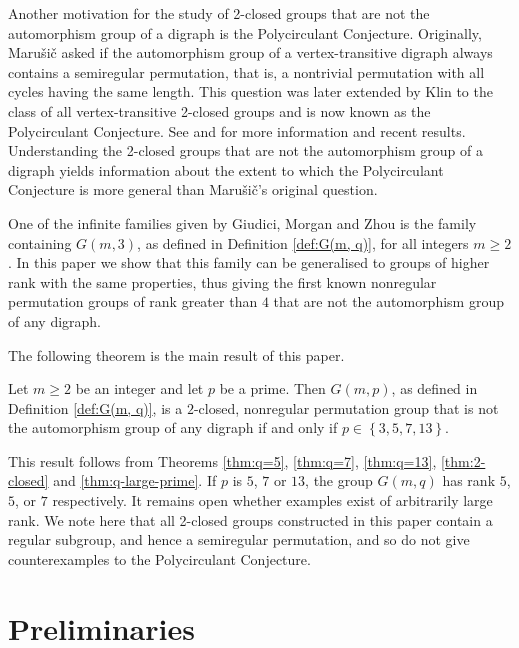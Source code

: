 Another motivation for the study of 2-closed groups that are not the automorphism group of a digraph is the Polycirculant Conjecture. Originally, Maru\v{s}i\v{c} \cite{ref:marusic-vertex} asked if the automorphism group of a vertex-transitive digraph always contains a semiregular permutation, that is, a nontrivial permutation with all cycles having the same length.  This question was later extended by Klin \cite{ref:cameron-research} to the class of all vertex-transitive 2-closed groups and is now known as the Polycirculant Conjecture. See \cite{ref:cameron-transitive} and \cite{ref:arezoomand-polycirculant} for more information and recent results. Understanding the 2-closed groups that are not the automorphism group of a digraph yields information about the extent to which the Polycirculant Conjecture is more general than Maru\v{s}i\v{c}'s original question.

One of the infinite families given by Giudici, Morgan and Zhou \cite{ref:giudici-primitive} is the family containing $G{\left(m, 3 \right)}$, as defined in Definition \ref{def:G(m, q)}, for all integers $m \geqslant 2$. In this paper we show that this family can be generalised to groups of higher rank with the same properties, thus giving the first known nonregular permutation groups of rank greater than $4$ that are not the automorphism group of any digraph.

The following theorem is the main result of this paper.

\begin{theorem}
Let $m \geqslant 2$ be an integer and let $p$ be a prime. Then $G{\left(m, p \right)}$, as defined in Definition \ref{def:G(m, q)}, is a $2$-closed, nonregular permutation group that is not the automorphism group of any digraph if and only if $p \in \left\{3, 5, 7, 13 \right\}$.
\end{theorem}

This result follows from Theorems \ref{thm:q=5}, \ref{thm:q=7}, \ref{thm:q=13}, \ref{thm:2-closed} and \ref{thm:q-large-prime}. If $p$ is $5$, $7$ or $13$, the group $G{\left(m, q \right)}$ has rank $5$, $5$, or $7$ respectively. It remains open whether examples exist of arbitrarily large rank. We note here that all 2-closed groups constructed in this paper contain a regular subgroup, and hence a semiregular permutation, and so do not give counterexamples to the Polycirculant Conjecture.

\section{Preliminaries}

